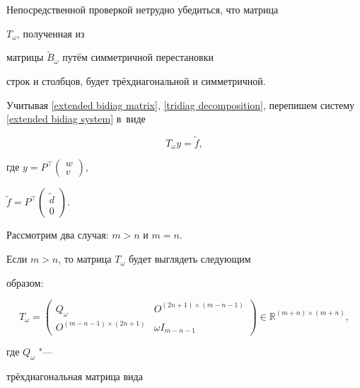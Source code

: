 Непосредственной проверкой нетрудно убедиться, что матрица

$T_{\omega} $, полученная из

матрицы $\widetilde{B}_{\omega}$ путём симметричной перестановки

строк и столбцов, будет трёхдиагональной и симметричной.



Учитывая \eqref{extended bidiag matrix}, \eqref{tridiag decomposition}, перепишем систему \eqref{extended bidiag system} в~виде

\begin{equation}

\label{tridiag system} T_{\omega} y = \widetilde{f},

\end{equation}

где $y = P^\top    \left( \begin{array}{c} w \\ v \end{array} \right)$,

$\widetilde{f} = P^\top    \left( \begin{array}{c} \widetilde{d} \\ 0

\end{array} \right)$.



Рассмотрим два случая: $m>n$ и $m=n$.



Если $m>n$, то матрица $T_{\omega}$ будет выглядеть следующим

образом:

\begin{equation}

\label{tridiag rectangle T-matrix} T_{\omega} = \left(

\begin{array}{cc}

Q_{\omega} & O^{(2n+1) \times (m-n-1)} \\

O^{(m-n-1) \times (2n+1)} & {\omega I_{m-n-1}}

\end{array}

\right) \in {\mathbb{R}}^{(m+n) \times (m+n)},

\end{equation}

где $Q_{\omega} $ "---

трёхдиагональная матрица вида

